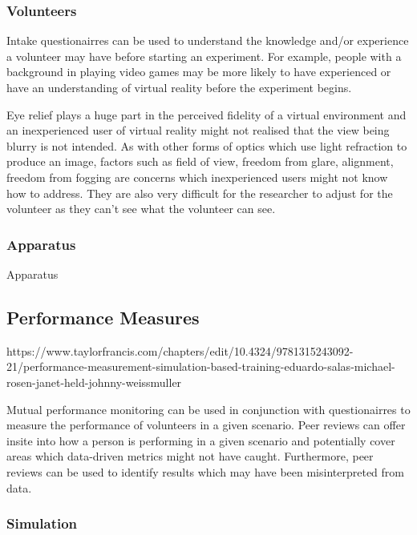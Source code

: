 \documentclass[12pt]{article}
\begin{document}
\subsubsection{Volunteers}

Intake questionairres can be used to understand the knowledge and/or experience a volunteer may have before starting an experiment. For example, people with a background in playing video games may be more likely to have experienced or have an understanding of virtual reality before the experiment begins. 

Eye relief plays a huge part in the perceived fidelity of a virtual environment and an inexperienced user of virtual reality might not realised that the view being blurry is not intended. As with other forms of optics which use light refraction to produce an image, factors such as field of view, freedom from glare, alignment, freedom from fogging \cite{angel2005examination} are concerns which inexperienced users might not know how to address. They are also very difficult for the researcher to adjust for the volunteer as they can't see what the volunteer can see.

\subsubsection{Apparatus}

Apparatus

\subsection{Performance Measures} \label{performanceMeasures}

https://www.taylorfrancis.com/chapters/edit/10.4324/9781315243092-21/performance-measurement-simulation-based-training-eduardo-salas-michael-rosen-janet-held-johnny-weissmuller

Mutual performance monitoring can be used in conjunction with questionairres to measure the performance of volunteers in a given scenario. \cite{salas2017performance} Peer reviews can offer insite into how a person is performing in a given scenario and potentially cover areas which data-driven metrics might not have caught. Furthermore, peer reviews can be used to identify results which may have been misinterpreted from data. 

\subsubsection{Simulation}
\end{document}
